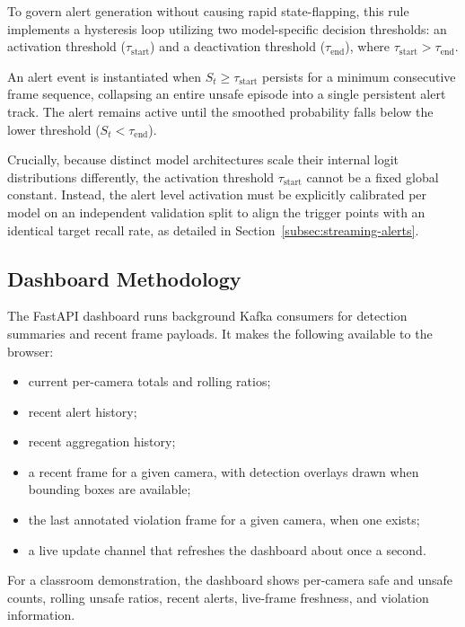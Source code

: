 \documentclass[conference]{IEEEtran}
\begin{document}
To govern alert generation without causing rapid state-flapping, this rule implements a hysteresis loop utilizing two model-specific decision thresholds: an activation threshold ($\tau_{\text{start}}$) and a deactivation threshold ($\tau_{\text{end}}$), where $\tau_{\text{start}} > \tau_{\text{end}}$. 

An alert event is instantiated when $S_t \ge \tau_{\text{start}}$ persists for a minimum consecutive frame sequence, collapsing an entire unsafe episode into a single persistent alert track. The alert remains active until the smoothed probability falls below the lower threshold ($S_t < \tau_{\text{end}}$). 

Crucially, because distinct model architectures scale their internal logit distributions differently, the activation threshold $\tau_{\text{start}}$ cannot be a fixed global constant. Instead, the alert level activation must be explicitly calibrated per model on an independent validation split to align the trigger points with an identical target recall rate, as detailed in Section~\ref{subsec:streaming-alerts}.

\subsection{Dashboard Methodology}

The FastAPI dashboard runs background Kafka consumers for detection
summaries and recent frame payloads. It makes the following available to the
browser:

\begin{itemize}
    \item current per-camera totals and rolling ratios;

    \item recent alert history;

    \item recent aggregation history;

    \item a recent frame for a given camera, with detection overlays drawn when
    bounding boxes are available;

    \item the last annotated violation frame for a given camera, when one exists;

    \item a live update channel that refreshes the dashboard about once a second.
\end{itemize}

For a classroom demonstration, the dashboard shows per-camera safe and
unsafe counts, rolling unsafe ratios, recent alerts, live-frame freshness,
and violation information.
\end{document}
